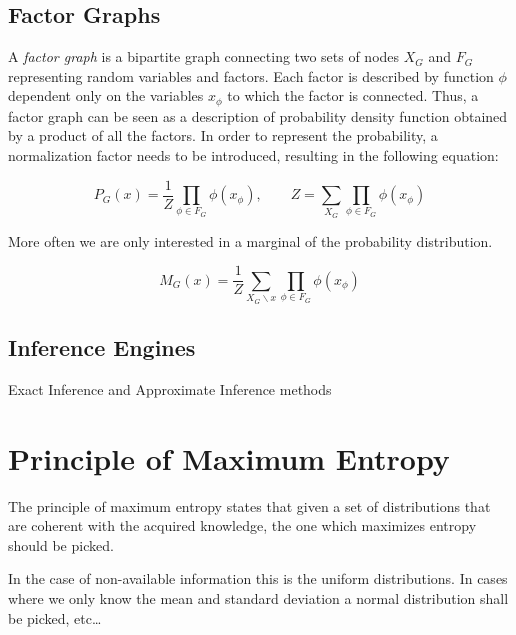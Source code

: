 \subsection{Factor Graphs}
A \emph{factor graph} is a bipartite graph connecting two sets of nodes $X_G$ and $F_G$
representing random variables and factors.
Each factor is described by function $\phi$ dependent only on the variables $x_\phi$
to which the factor is connected.
Thus, a factor graph can be seen as a description of probability density function obtained
by a product of all the factors. In order to represent the probability,
a normalization factor needs to be introduced, resulting in the following equation:

\begin{equation}
P_G(x) = \frac{1}{Z}\prod_{\phi \in F_G}{\phi(x_{\phi})},\qquad
Z = \sum_{X_G}\prod_{\phi \in F_G}{\phi(x_{\phi})}
\end{equation}


More often we are only interested in a marginal of the probability distribution.

\begin{equation}
M_G(x) = \frac{1}{Z}\sum_{X_G \backslash x}{\prod_{\phi \in F_G}{\phi(x_{\phi})}}
\end{equation}

\subsection{Inference Engines}
Exact Inference and Approximate Inference methods

\section{Principle of Maximum Entropy}
\label{sec:max-entropy}
The principle of maximum entropy states that given a set of distributions that
are coherent with the acquired knowledge, the one which maximizes entropy should
be picked.

In the case of non-available information this is the uniform distributions.
In cases where we only know the mean and standard deviation a normal
distribution shall be picked, etc\dots


